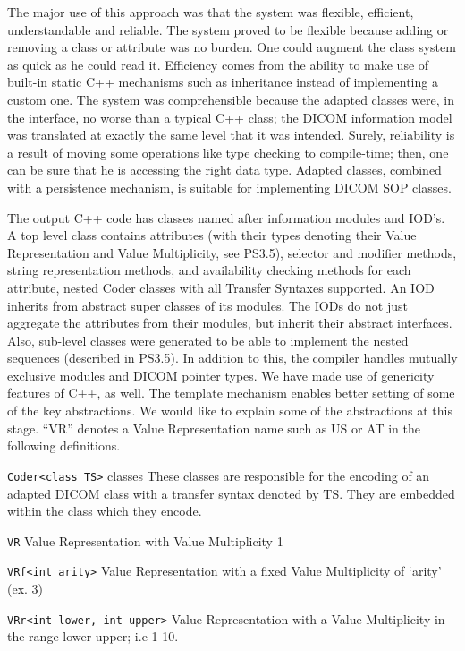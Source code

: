 \documentclass[a4paper,10pt]{article}
\begin{document}
The major use of this approach was that the system was flexible, efficient,
understandable and reliable. The system proved to be flexible because adding
or removing a class or attribute was no burden. One could augment the class
system as quick as he could read it. Efficiency comes from the ability to
make use of built-in static C++ mechanisms such as inheritance instead of
implementing a custom one. The system was comprehensible because the adapted
classes were, in the interface, no worse than a typical C++ class; the DICOM
information model was translated at exactly the same level that it was
intended. Surely, reliability is a result of moving some operations like
type checking to compile-time; then, one can be sure that he is accessing
the right data type. Adapted classes, combined with a persistence mechanism,
is suitable for implementing DICOM SOP classes.


The output C++ code has classes named after information modules and IOD's.
A top level class contains attributes (with their types denoting their Value
Representation and Value Multiplicity, see PS3.5), selector and modifier
methods, string representation methods, and availability checking methods
for each attribute, nested Coder classes with all Transfer Syntaxes
supported. An IOD inherits from abstract super classes of its modules. The
IODs do not just aggregate the attributes from their modules, but inherit
their abstract interfaces. Also, sub-level classes were generated to be able
to implement the nested sequences (described in PS3.5). In addition to this,
the compiler handles mutually exclusive modules and DICOM pointer types. We
have made use of genericity features of C++, as well. The template mechanism
enables better setting of some of the key abstractions. We would like to
explain some of the abstractions at this stage. ``VR'' denotes a Value
Representation name such as US or AT in the following definitions.


\verb+Coder<class TS>+ classes These classes are responsible for the
encoding of an adapted DICOM class with a transfer syntax denoted by
TS. They are embedded within the class which they encode.

\verb+VR+ Value Representation with Value Multiplicity 1

\verb+VRf<int arity>+ Value Representation with a fixed Value Multiplicity of {`}arity{'} (ex. 3)

\verb+VRr<int lower, int upper>+ Value Representation with a Value
Multiplicity in the range lower-upper; i.e  1-10.
\end{document}
